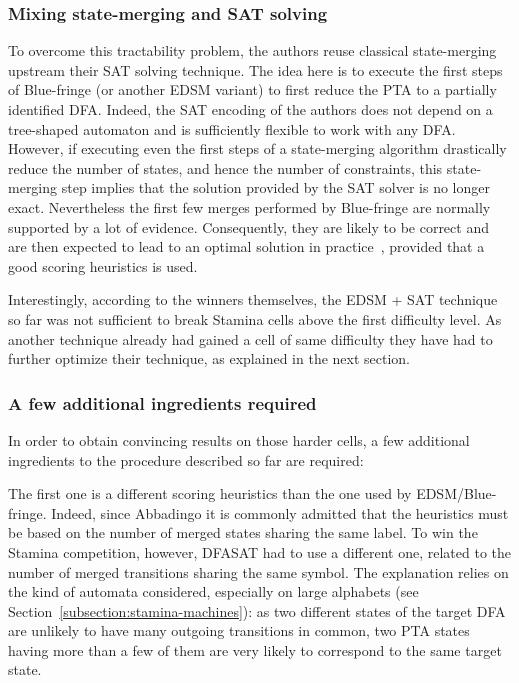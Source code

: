 \subsubsection*{Mixing state-merging and SAT solving}

To overcome this tractability problem, the authors reuse classical state-merging upstream their SAT solving technique. The idea here is to execute the first steps of Blue-fringe (or another EDSM variant) to first reduce the PTA to a partially identified DFA. Indeed, the SAT encoding of the authors does not depend on a tree-shaped automaton and is sufficiently flexible to work with any DFA. However, if executing even the first steps of a state-merging algorithm drastically reduce the number of states, and hence the number of constraints, this state-merging step implies that the solution provided by the SAT solver is no longer exact. Nevertheless the first few merges performed by Blue-fringe are normally supported by a lot of evidence. Consequently, they are likely to be correct and are then expected to lead to an optimal solution in practice~\cite{Heule:2010}, provided that a good scoring heuristics is used. 

Interestingly, according to the winners themselves, the EDSM + SAT technique so far was not sufficient to break Stamina cells above the first difficulty level. As another technique already had gained a cell of same difficulty they have had to further optimize their technique, as explained in the next section.

\subsubsection*{A few additional ingredients required}

In order to obtain convincing results on those harder cells, a few additional ingredients to the procedure described so far are required:

The first one is a different scoring heuristics than the one used by EDSM/Blue-fringe. Indeed, since Abbadingo it is commonly admitted that the heuristics must be based on the number of merged states sharing the same label. To win the Stamina competition, however, DFASAT had to use a different one, related to the number of merged transitions sharing the same symbol. The explanation relies on the kind of automata considered, especially on large alphabets (see Section~\ref{subsection:stamina-machines}): as two different states of the target DFA are unlikely to have many outgoing transitions in common, two PTA states having more than a few of them are very likely to correspond to the same target state.


